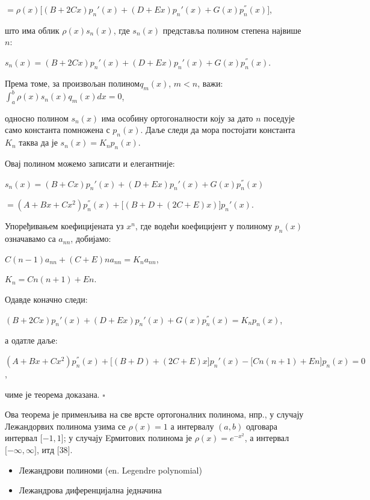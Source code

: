 \(= \rho(x)\lbrack(B + 2Cx)p_{n}'(x) + (D + Ex)p_{n}'(x) + G(x)p_{n}^{''}(x)\rbrack\),

што има облик \(\rho(x)s_{n}(x)\), где \(s_{n}(x)\) представља полином
степена највише \(n\):

\(s_{n}(x) = (B + 2Cx)p_{n}'(x) + (D + Ex)p_{n}'(x) + G(x)p_{n}^{''}(x)\).

Према томе, за произвољан полином\(q_{m}(x)\), \(m < n\), важи:
\(\int_{a}^{b}\rho(x)s_{n}(x)q_{m}(x)dx = 0\),

односно полином \(s_{n}(x)\) има особину ортогоналности коју за дато
\(n\) поседује само константа помножена с \(p_{n}(x)\). Даље следи да
мора постојати константа \(K_{n}\) таква да је
\(s_{n}(x) = K_{n}p_{n}(x)\).

Овај полином можемо записати и елегантније:

\(s_{n}(x) = (B + Cx)p_{n}'(x) + (D + Ex)p_{n}'(x) + G(x)p_{n}^{''}(x)\)

\(= (A + Bx + Cx^{2})p_{n}^{''}(x) + \lbrack(B + D + (2C + E)x)\rbrack p_{n}'(x)\).

Упоређивањем коефицијената уз \(x^{n}\), где водећи коефицијент у
полиному \(p_{n}(x)\) означавамо са \(a_{nn}\), добијамо:

\(C(n - 1)a_{nn} + (C + E)na_{nn} = K_{n}a_{nn}\),

\(K_{n} = Cn(n + 1) + En\).

Одавде коначно следи:

\((B + 2Cx)p_{n}'(x) + (D + Ex)p_{n}'(x) + G(x)p_{n}^{''}(x) = K_{n}p_{n}(x)\),

а одатле даље:

\((A + Bx + Cx^{2})p_{n}^{''}(x) + \lbrack(B + D) + (2C + E)x\rbrack p_{n}'(x) - \lbrack Cn(n + 1) + En\rbrack p_{n}(x) = 0\),

чиме је теорема доказана. \(\square\)

Ова теорема је применљива на све врсте ортогоналних полинома, нпр., у
случају Лежандорвих полинома узима се \(\rho(x) = 1\) а интервалу
\((a,b)\) одговара интервал \(\lbrack - 1,1\rbrack\); у случају
Eрмитових полинома је \(\rho(x) = e^{- x^{2}}\), а интервал
\(\lbrack - \infty,\infty\rbrack\), итд {[}38{]}.

\begin{itemize}
\item
  Лежандрови полиноми (en. Legendre polynomial)
\end{itemize}

\begin{itemize}
\item
  Лежандрова диференцијална једначина
\end{itemize}


